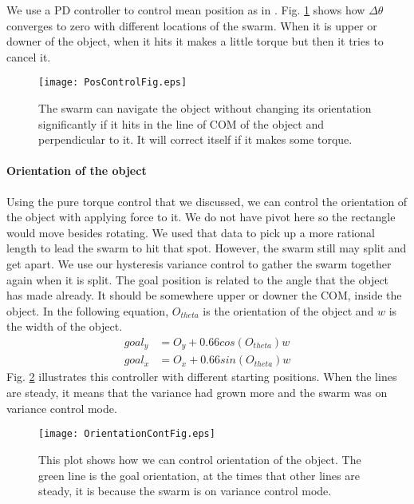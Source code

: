We use a PD controller to control mean position as in \cite{ShahrokhiIROS2015}. Fig. \ref{fig:PosControlFig} shows how $\Delta \theta$ converges to zero with different locations of the swarm. When it is upper or downer of the object, when it hits it makes a little torque but then it tries to cancel it.
\begin{figure}
\begin{center}
	\texttt{[image: PosControlFig.eps]}
\end{center}
\vspace{-1em}
\caption{\label{fig:PosControlFig}
The swarm can navigate the object without changing its orientation significantly if it hits in the line of COM of the object and perpendicular to it. It will correct itself if it makes some torque.
}
\vspace{-1em}
\end{figure}

\paragraph{Orientation of the object}
Using the pure torque control that we discussed, we can control the orientation of the object with applying force to it. We do not have pivot here so the rectangle would move besides rotating. We used that data to pick up a more rational length to lead the swarm to hit that spot. However, the swarm still may split and get apart. We use our hysteresis variance control to gather the swarm together again when it is split. The goal position is related to the angle that the object has made already. It should be somewhere upper or downer the COM, inside the object. In the following equation, $O_{theta}$ is the orientation of the object and $w$ is the width of the object.
\begin{align}\nonumber
goal_y &= O_y + 0.66cos(O_{theta})w\\
goal_x &= O_x + 0.66sin(O_{theta})w
\end{align}
Fig. \ref{fig:OrientCont} illustrates this controller with different starting positions. When the lines are steady, it means that the variance had grown more and the swarm was on variance control mode.
\begin{figure}
\begin{center}
	\texttt{[image: OrientationContFig.eps]}
\end{center}
\vspace{-1em}
\caption{\label{fig:OrientCont}
This plot shows how we can control orientation of the object. The green line is the goal orientation, at the times that other lines are steady, it is because the swarm is on variance control mode.
}
\vspace{-1em}
\end{figure}


